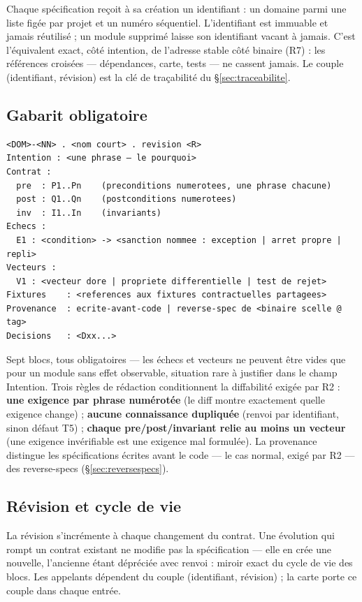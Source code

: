 Chaque spécification reçoit à sa création un identifiant  : un domaine
parmi une liste figée par projet et un numéro séquentiel. L’identifiant est immuable et
jamais réutilisé ; un module supprimé laisse son identifiant vacant à jamais. C’est
l’équivalent exact, côté intention, de l’adresse stable côté binaire (R7) : les références
croisées — dépendances, carte, tests — ne cassent jamais. Le couple (identifiant,
révision) est la clé de traçabilité du §\ref{sec:traceabilite}.

\subsection{Gabarit obligatoire}

\begin{lstlisting}
<DOM>-<NN> . <nom court> . revision <R>
Intention : <une phrase — le pourquoi>
Contrat :
  pre  : P1..Pn    (preconditions numerotees, une phrase chacune)
  post : Q1..Qn    (postconditions numerotees)
  inv  : I1..In    (invariants)
Echecs :
  E1 : <condition> -> <sanction nommee : exception | arret propre | repli>
Vecteurs :
  V1 : <vecteur dore | propriete differentielle | test de rejet>
Fixtures    : <references aux fixtures contractuelles partagees>
Provenance  : ecrite-avant-code | reverse-spec de <binaire scelle @ tag>
Decisions   : <Dxx...>
\end{lstlisting}

Sept blocs, tous obligatoires — les échecs et vecteurs ne peuvent être vides que pour un
module sans effet observable, situation rare à justifier dans le champ Intention. Trois
règles de rédaction conditionnent la diffabilité exigée par R2 : \textbf{une exigence par
phrase numérotée} (le diff montre exactement quelle exigence change) ; \textbf{aucune
connaissance dupliquée} (renvoi par identifiant, sinon défaut T5) ; \textbf{chaque
pre/post/invariant relie au moins un vecteur} (une exigence invérifiable est une exigence
mal formulée). La provenance distingue les spécifications écrites avant le code — le cas
normal, exigé par R2 — des reverse-specs (§\ref{sec:reversespecs}).

\subsection{Révision et cycle de vie}

La révision s’incrémente à chaque changement du contrat. Une évolution qui rompt un
contrat existant ne modifie pas la spécification — elle en crée une nouvelle, l’ancienne
étant dépréciée avec renvoi : miroir exact du cycle de vie des blocs. Les appelants
dépendent du couple (identifiant, révision) ; la carte porte ce couple dans chaque entrée.

